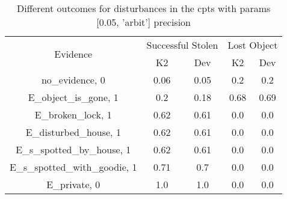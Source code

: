 \begin{table}\begin{tabular}{c|cc|cc}\toprule\multirow{2}{*}{Evidence} & \multicolumn{2}{c}{Successful Stolen} & \multicolumn{2}{c}{Lost Object} \\& {K2} & {Dev} & {K2} & {Dev} \\\midrule
no\_evidence, 0 & \cellcolor{Bittersweet}0.06&\cellcolor{Bittersweet}0.05&0.2&0.2\\E\_object\_is\_gone, 1 & \cellcolor{Bittersweet}0.2&\cellcolor{Bittersweet}0.18&\cellcolor{Bittersweet}0.68&\cellcolor{Bittersweet}0.69\\E\_broken\_lock, 1 & \cellcolor{Bittersweet}0.62&\cellcolor{Bittersweet}0.61&0.0&0.0\\E\_disturbed\_house, 1 & \cellcolor{Bittersweet}0.62&\cellcolor{Bittersweet}0.61&0.0&0.0\\E\_s\_spotted\_by\_house, 1 & \cellcolor{Bittersweet}0.62&\cellcolor{Bittersweet}0.61&0.0&0.0\\E\_s\_spotted\_with\_goodie, 1 & \cellcolor{Bittersweet}0.71&\cellcolor{Bittersweet}0.7&0.0&0.0\\E\_private, 0 & 1.0&1.0&0.0&0.0\\\bottomrule\end{tabular}\caption{Different outcomes for disturbances in the cpts with params [0.05, 'arbit'] precision}\end{table}